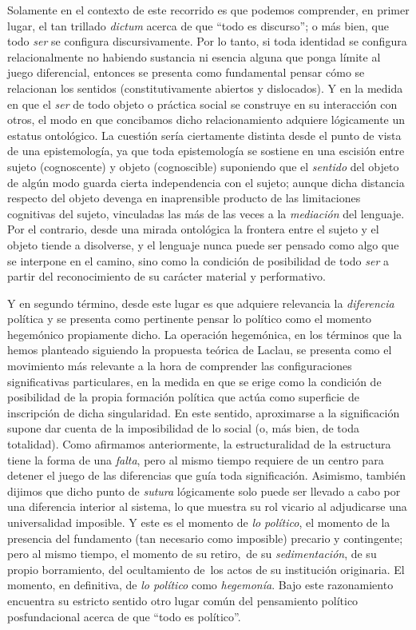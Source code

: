 Solamente en el contexto de este recorrido es que podemos comprender, en primer lugar, el tan trillado \emph{dictum} acerca de que \enquote{todo es discurso}; o más bien, que todo \emph{ser} se configura discursivamente. Por lo tanto, si toda identidad se configura relacionalmente no habiendo sustancia ni esencia alguna que ponga límite al juego diferencial, entonces se presenta como fundamental pensar cómo se relacionan los sentidos (constitutivamente abiertos y dislocados). Y en la medida en que el \emph{ser} de todo objeto o práctica social se construye en su interacción con otros, el modo en que concibamos dicho relacionamiento adquiere lógicamente un estatus ontológico. La cuestión sería ciertamente distinta desde el punto de vista de una epistemología, ya que toda epistemología se sostiene en una escisión entre sujeto (cognoscente) y objeto (cognoscible) suponiendo que el \emph{sentido} del objeto de algún modo guarda cierta independencia con el sujeto; aunque dicha distancia respecto del objeto devenga en inaprensible producto de las limitaciones cognitivas del sujeto, vinculadas las más de las veces a la \emph{mediación} del lenguaje. Por el contrario, desde una mirada ontológica la frontera entre el sujeto y el objeto tiende a disolverse, y el lenguaje nunca puede ser pensado como algo que se interpone en el camino, sino como la condición de posibilidad de todo \emph{ser} a partir del reconocimiento de su carácter material y performativo.

Y en segundo término, desde este lugar es que adquiere relevancia la \emph{diferencia} política y se presenta como pertinente pensar lo político como el momento hegemónico propiamente dicho. La operación hegemónica, en los términos que la hemos planteado siguiendo la propuesta teórica de Laclau, se presenta como el movimiento más relevante a la hora de comprender las configuraciones significativas particulares, en la medida en que se erige como la condición de posibilidad de la propia formación política que actúa como superficie de inscripción de dicha singularidad. En este sentido, aproximarse a la significación supone dar cuenta de la imposibilidad de lo social (o, más bien, de toda totalidad). Como afirmamos anteriormente, la estructuralidad de la estructura tiene la forma de una \emph{falta}, pero al mismo tiempo requiere de un centro para detener el juego de las diferencias que guía toda significación. Asimismo, también dijimos que dicho punto de \emph{sutura} lógicamente solo puede ser llevado a cabo por una diferencia interior al sistema, lo que muestra su rol vicario al adjudicarse una universalidad imposible. Y este es el momento de \emph{lo político}, el momento de la presencia del fundamento (tan necesario como imposible) precario y contingente; pero al mismo tiempo, el momento de su retiro,~de su \emph{sedimentación}, de su propio borramiento, del ocultamiento de~los actos de su institución originaria. El momento, en definitiva, de \emph{lo político} como \emph{hegemonía}. Bajo este razonamiento encuentra su estricto sentido otro lugar común del pensamiento político posfundacional acerca de que \enquote{todo es político}.

